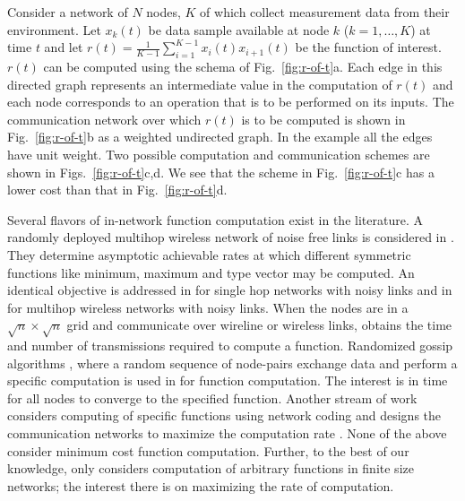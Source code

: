 \documentclass[journal]{IEEEtran}
\begin{document}
Consider a network of $N$ nodes, $K$ of which collect measurement data
from their environment. Let $x_k(t)$ be data sample available at node
$k$ ($k=1, \ldots, K$) at time $t$ and let $r(t) = \frac{1}{K-1}
\sum_{i=1}^{K-1} x_{i}(t) x_{i+1}(t)$ be the function of
interest. $r(t)$ can be computed using the schema of
Fig.~\ref{fig:r-of-t}a. Each edge in this directed graph represents an
intermediate value in the computation of $r(t)$ and each node
corresponds to an operation that is to be performed on its inputs. The
communication network over which $r(t)$ is to be computed is shown in
Fig.~\ref{fig:r-of-t}b as a weighted undirected graph. In the example
all the edges have unit weight. Two possible computation and
communication schemes are shown in
Figs.~\ref{fig:r-of-t}c,d. We see that the scheme in
Fig.~\ref{fig:r-of-t}c has a lower cost than that in
Fig.~\ref{fig:r-of-t}d.

Several flavors of in-network function computation exist in the
literature. A randomly deployed multihop wireless network of noise
free links is considered in
\cite{Giridhar05,Giridhar06,Khude05,Kamath14}. They determine
asymptotic achievable rates at which different symmetric functions
like minimum, maximum and type vector may be computed. An identical
objective is addressed in
\cite{Gallager88,Kushilevitz98,Feige00,Newman04,Goyal05} for single
hop networks with noisy links and in \cite{Ying07,Dutta08} for
multihop wireless networks with noisy links. When the nodes are in a
$\sqrt{n} \times \sqrt{n}$ grid and communicate over wireline or
wireless links, \cite{Karamchandani11} obtains the time and number of
transmissions required to compute a function. Randomized gossip
algorithms \cite{Boyd05,Shah09}, where a random sequence of node-pairs
exchange data and perform a specific computation is used in
\cite{Mosk-Aoyama06,Ayaso08,Bodas11} for function computation. The
interest is in time for all nodes to converge to the specified
function. Another stream of work considers computing of specific
functions using network coding and designs the communication networks
to maximize the computation rate
\cite{Ramamoorthy10,Appuswamy11,Rai12}. None of the above consider
minimum cost function computation. Further, to the best of our
knowledge, only \cite{Shah13} considers computation of arbitrary
functions in finite size networks; the interest there is on maximizing
the rate of computation.
\end{document}
